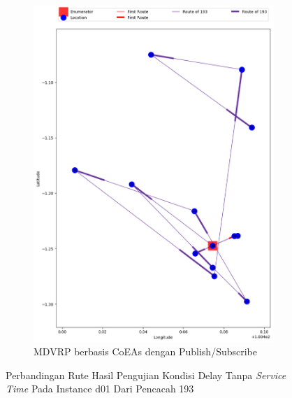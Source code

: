 \begin{figure}[H]\ContinuedFloat
	\centering
	\begin{subfigure}[t]{\textwidth}
		\centering
		\includegraphics[width=\textwidth]{Resources/Images/delayed_1/real_m15_n100_delayed_1_193_pubsub_coes}
		\caption{MDVRP berbasis CoEAs dengan Publish/Subscribe}
		\label{fig:real_m15_n100_delayed_1_193_pubsub_coes}
	\end{subfigure}
	\caption{Perbandingan Rute Hasil Pengujian Kondisi Delay Tanpa \textit{Service Time} Pada Instance d01 Dari Pencacah 193}
	\label{fig:real_m15_n100_delayed_1_193_contd}
\end{figure}


